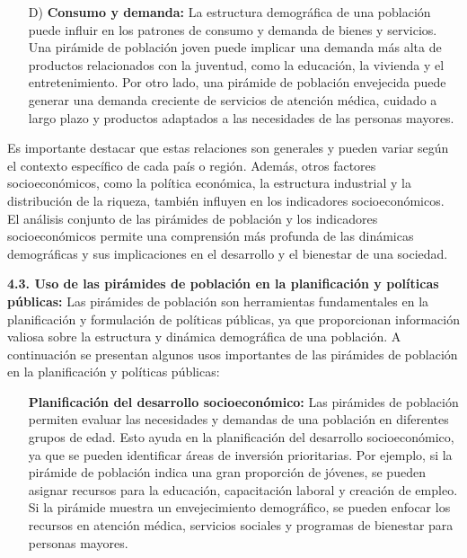 \documentclass[8pt,a4paper]{beamer}
\begin{document}
{\begin{frame}{}
\begin{block}{}
\begin{enumerate}
\item[D)] \textbf{Consumo y demanda:} La estructura demográfica de una población puede influir en los patrones de consumo y demanda de bienes y servicios. Una pirámide de población joven puede implicar una demanda más alta de productos relacionados con la juventud, como la educación, la vivienda y el entretenimiento. Por otro lado, una pirámide de población envejecida puede generar una demanda creciente de servicios de atención médica, cuidado a largo plazo y productos adaptados a las necesidades de las personas mayores.
\end{enumerate}
Es importante destacar que estas relaciones son generales y pueden variar según el contexto específico de cada país o región. Además, otros factores socioeconómicos, como la política económica, la estructura industrial y la distribución de la riqueza, también influyen en los indicadores socioeconómicos. El análisis conjunto de las pirámides de población y los indicadores socioeconómicos permite una comprensión más profunda de las dinámicas demográficas y sus implicaciones en el desarrollo y el bienestar de una sociedad.
\end{block}
\end{frame}


\begin{frame}{}
\begin{block}{\textbf{4.3. Uso de las pirámides de población en la planificación y políticas públicas:}}
\justifying
Las pirámides de población son herramientas fundamentales en la planificación y formulación de políticas públicas, ya que proporcionan información valiosa sobre la estructura y dinámica demográfica de una población. A continuación se presentan algunos usos importantes de las pirámides de población en la planificación y políticas públicas:
\begin{enumerate}
\justifying
\item[\ding{102}] \textbf{Planificación del desarrollo socioeconómico:} Las pirámides de población permiten evaluar las necesidades y demandas de una población en diferentes grupos de edad. Esto ayuda en la planificación del desarrollo socioeconómico, ya que se pueden identificar áreas de inversión prioritarias. Por ejemplo, si la pirámide de población indica una gran proporción de jóvenes, se pueden asignar recursos para la educación, capacitación laboral y creación de empleo. Si la pirámide muestra un envejecimiento demográfico, se pueden enfocar los recursos en atención médica, servicios sociales y programas de bienestar para personas mayores.


\end{enumerate}
\end{block}
\end{frame}}
\end{document}
